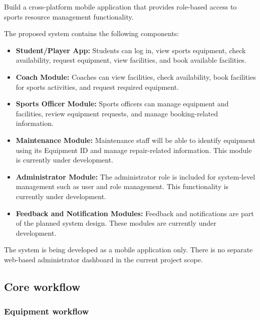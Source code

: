 \documentclass[11pt,a4paper]{article}
\begin{document}
Build a cross-platform mobile application that provides role-based
access to sports resource management functionality.

The proposed system contains the following components:

\begin{itemize}[leftmargin=0.7cm]

    \item \textbf{Student/Player App:}
    Students can log in, view sports equipment, check availability,
    request equipment, view facilities, and book available facilities.

    \item \textbf{Coach Module:}
    Coaches can view facilities, check availability, book facilities
    for sports activities, and request required equipment.

    \item \textbf{Sports Officer Module:}
    Sports officers can manage equipment and facilities, review
    equipment requests, and manage booking-related information.

    \item \textbf{Maintenance Module:}
    Maintenance staff will be able to identify equipment using its
    Equipment ID and manage repair-related information. This module is
    currently under development.

    \item \textbf{Administrator Module:}
    The administrator role is included for system-level management such
    as user and role management. This functionality is currently under
    development.

    \item \textbf{Feedback and Notification Modules:}
    Feedback and notifications are part of the planned system design.
    These modules are currently under development.

\end{itemize}

The system is being developed as a mobile application only. There is no
separate web-based administrator dashboard in the current project scope.

\subsection{Core workflow}

\subsubsection*{Equipment workflow}
\end{document}
